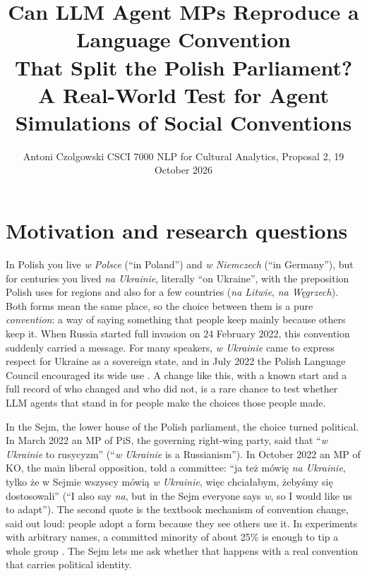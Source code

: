 \documentclass[10pt,twocolumn]{article}
\title{\vspace{-0.62in}\large\textbf{Can LLM Agent MPs Reproduce a Language Convention\\That Split the Polish Parliament?}\\[2pt]\normalsize A Real-World Test for Agent Simulations of Social Conventions}
\author{\normalsize Antoni Czolgowski \quad CSCI 7000 NLP for Cultural Analytics, Proposal 2, 19 October 2026}
\date{\vspace{-0.32in}}
\begin{document}
\maketitle

\section{Motivation and research questions}
In Polish you live \emph{w Polsce} (``in Poland'') and \emph{w Niemczech} (``in Germany''), but for centuries you lived \emph{na Ukrainie}, literally ``on Ukraine'', with the preposition Polish uses for regions and also for a few countries (\emph{na Litwie}, \emph{na Węgrzech}). Both forms mean the same place, so the choice between them is a pure \emph{convention}: a way of saying something that people keep mainly because others keep it. When Russia started full invasion on 24 February 2022, this convention suddenly carried a message. For many speakers, \emph{w Ukrainie} came to express respect for Ukraine as a sovereign state, and in July 2022 the Polish Language Council encouraged its wide use \citep{rjp2022}. A change like this, with a known start and a full record of who changed and who did not, is a rare chance to test whether LLM agents that stand in for people make the choices those people made.

In the Sejm, the lower house of the Polish parliament, the choice turned political. In March 2022 an MP of PiS, the governing right-wing party, said that ``\emph{w Ukrainie} to rusycyzm'' (``\emph{w Ukrainie} is a Russianism''). In October 2022 an MP of KO, the main liberal opposition, told a committee: ``ja też mówię \emph{na Ukrainie}, tylko że w Sejmie wszyscy mówią \emph{w Ukrainie}, więc chciałabym, żebyśmy się dostosowali'' (``I also say \emph{na}, but in the Sejm everyone says \emph{w}, so I would like us to adapt''). The second quote is the textbook mechanism of convention change, said out loud: people adopt a form because they see others use it. In experiments with arbitrary names, a committed minority of about 25\% is enough to tip a whole group \citep{centola2018}. The Sejm lets me ask whether that happens with a real convention that carries political identity.
\end{document}
